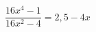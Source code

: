 \begin{ex}[type=equation]
	\begin{condition}
		$\dfrac{16x^4 - 1}{16x^2 - 4} = 2,5 - 4x$
	\end{condition}
\end{ex}